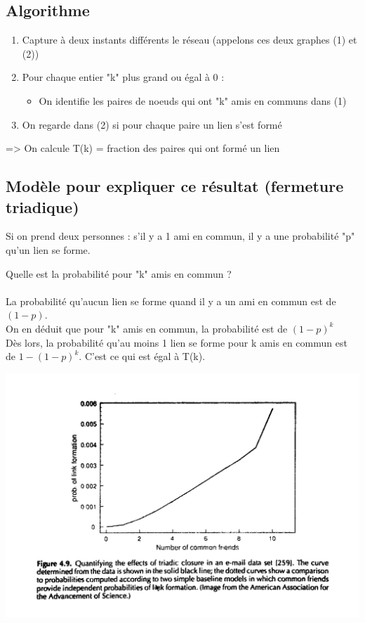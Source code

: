 \subsection{Algorithme}
\begin{enumerate}
\item Capture à deux instants différents le réseau (appelons ces deux graphes (1) et (2))
\item Pour chaque entier "k" plus grand ou égal à 0 :
\begin{itemize}
	\item On identifie les paires de noeuds qui ont "k" amis en communs dans (1)
\end{itemize}
\item On regarde dans (2) si pour chaque paire un lien s'est formé
\end{enumerate}
=> On calcule T(k) = fraction des paires qui ont formé un lien

\subsection{Modèle pour expliquer ce résultat (fermeture triadique)}
Si on prend deux personnes : s'il y a 1 ami en commun, il y a une probabilité "p" qu'un lien se forme.

Quelle est la probabilité pour "k" amis en commun ?

\paragraph*{}
La probabilité qu'aucun lien se forme quand il y a un ami en commun est de $(1-p)$.\\
On en déduit que pour "k" amis en commun, la probabilité est de $ (1-p)^{k}$\\
Dès lors, la probabilité qu'au moins 1 lien se forme pour k amis en commun est de $ 1-(1-p)^{k}$. C'est ce qui est égal à T(k).

\includegraphics[width=\textwidth]{images/21_emailFriends.jpg}

